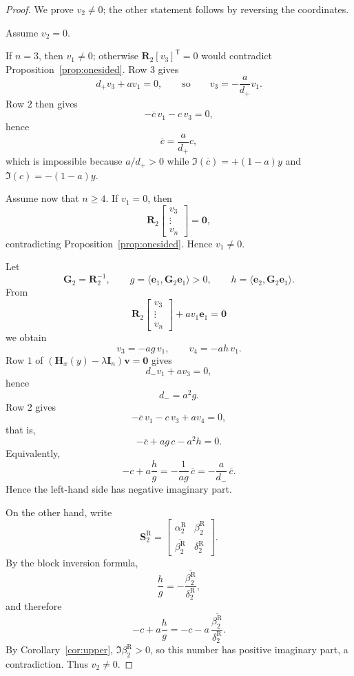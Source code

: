 \documentclass[11pt]{article}
\numberwithin{equation}{section}
\begin{document}
\begin{proof}
We prove $v_2\neq0$; the other statement follows by reversing the coordinates.

Assume $v_2=0$.

If $n=3$, then $v_1\neq0$; otherwise $\mathbf R_2[v_3]^{\mathsf T}=0$ would
contradict Proposition~\ref{prop:onesided}.  Row $3$ gives
\[
d_+v_3+av_1=0,
\qquad\text{so}\qquad
v_3=-\frac{a}{d_+}v_1.
\]
Row $2$ then gives
\[
-\overline c\,v_1-c\,v_3=0,
\]
hence
\[
\overline c=\frac{a}{d_+}c,
\]
which is impossible because $a/d_+>0$ while
$\Im(\overline c)=+(1-a)y$ and $\Im(c)=-(1-a)y$.

Assume now that $n\ge4$.  If $v_1=0$, then
\[
\mathbf R_2
\begin{bmatrix}
v_3\\
\vdots\\
v_n
\end{bmatrix}
=
\bm 0,
\]
contradicting Proposition~\ref{prop:onesided}.  Hence $v_1\neq0$.

Let
\[
\mathbf G_2=\mathbf R_2^{-1},
\qquad
g=\langle \bm e_1,\mathbf G_2\bm e_1\rangle>0,
\qquad
h=\langle \bm e_2,\mathbf G_2\bm e_1\rangle.
\]
From
\[
\mathbf R_2
\begin{bmatrix}
v_3\\
\vdots\\
v_n
\end{bmatrix}
+
av_1\bm e_1
=
\bm 0
\]
we obtain
\[
v_3=-ag\,v_1,
\qquad
v_4=-ah\,v_1.
\]
Row $1$ of
$(\mathbf H_x(y)-\lambda\mathbf I_n)\bm v=\bm0$ gives
\[
d_-v_1+av_3=0,
\]
hence
\[
d_-=a^2g.
\]
Row $2$ gives
\[
-\overline c\,v_1-c\,v_3+av_4=0,
\]
that is,
\[
-\overline c+ag\,c-a^2h=0.
\]
Equivalently,
\[
-c+a\frac{h}{g}
=
-\frac{1}{ag}\,\overline c
=
-\frac{a}{d_-}\,\overline c.
\]
Hence the left-hand side has negative imaginary part.

On the other hand, write
\[
\mathbf S_2^{\mathrm R}
=
\begin{bmatrix}
\alpha_2^{\mathrm R} & \beta_2^{\mathrm R}\\
\overline{\beta_2^{\mathrm R}} & \delta_2^{\mathrm R}
\end{bmatrix}.
\]
By the block inversion formula,
\[
\frac{h}{g}
=
-\frac{\overline{\beta_2^{\mathrm R}}}{\delta_2^{\mathrm R}},
\]
and therefore
\[
-c+a\frac{h}{g}
=
-c-a\,\frac{\overline{\beta_2^{\mathrm R}}}{\delta_2^{\mathrm R}}.
\]
By Corollary~\ref{cor:upper}, $\Im\beta_2^{\mathrm R}>0$, so this number has
positive imaginary part, a contradiction.  Thus $v_2\neq0$.
\end{proof}
\end{document}
